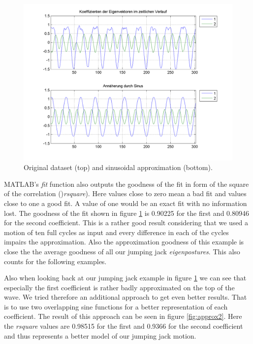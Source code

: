 \documentclass[a4paper]{article}
\begin{document}
\begin{figure}
		\centering
		\includegraphics[width=\textwidth]{1sinHamp.png}
		\caption{Original dataset (top) and sinusoidal approximation (bottom).}
		\label{fig:approx}
\end{figure}

MATLAB's \emph{fit} function also outputs the goodness of the fit in form of the square of the correlation ()\emph{rsquare}).
Here values close to zero mean a bad fit and values close to one a good fit.
A value of one would be an exact fit with no information lost.
The goodness of the fit shown in figure \ref{fig:approx} is 0.90225 for the first and 0.80946 for the second coefficient.
This is a rather good result considering that we used a motion of ten full cycles as input and every difference in each of the cycles impairs the approximation.
Also the approximation goodness of this example is close the the average goodness of all our jumping jack \emph{eigenpostures}.
This also counts for the following examples.

Also when looking back at our jumping jack example in figure \ref{fig:approx} we can see that especially the first coefficient is rather badly approximated on the top of the wave.
We tried therefore an additional approach to get even better results. That is to use two overlapping sine functions for a better representation of each coefficient.
The result of this approach can be seen in figure \ref{fig:approx2}.
Here the \emph{rsquare} values are 0.98515 for the first and 0.9366 for the second coefficient and thus represents a better model of our jumping jack motion.
\end{document}
